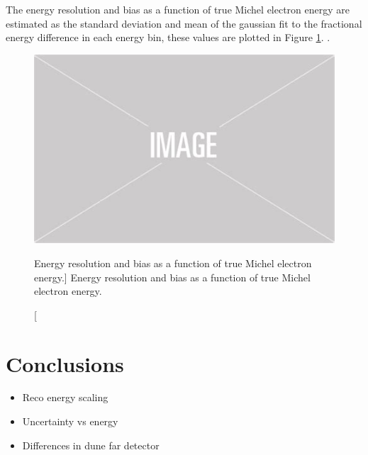 The energy resolution and bias as a function of true Michel electron energy are 
estimated as the standard deviation and mean of the gaussian fit to the
fractional energy difference in each energy bin, these values are plotted in
Figure \ref{fig:res_and_bias_energy}. .
\begin{figure}
	\centering
	\includegraphics[width=\textwidth]{figures/placeholder.png}
	\caption
	[Energy resolution and bias as a function of true Michel electron energy.]
	{Energy resolution and bias as a function of true Michel electron energy.}
	\label{fig:res_and_bias_energy}
\end{figure}

\section{Conclusions} \label{ME_EU}
\begin{mccorrection}
	\begin{itemize}
		\item Reco energy scaling
		\item Uncertainty vs energy
		\item Differences in dune far detector
	\end{itemize}
\end{mccorrection}
